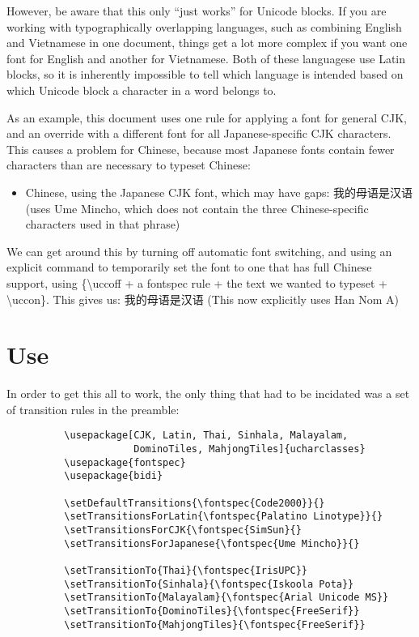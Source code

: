 ﻿\documentclass{article}
\newenvironment{itemlist}{%
  \begin{itemize}
	\setlength{\itemsep}{0pt}
	\setlength{\parsep}{0pt}
	\setlength{\topsep}{0pt}
	\setlength{\partopsep}{0pt}
	\setlength{\parskip}{0pt}
	\setlength{\labelsep}{5pt}}%
{
  \end{itemize}}
\begin{document}
		However, be aware that this only “just works” for Unicode blocks. If you are working with typographically overlapping languages, such as combining English and Vietnamese in one document, things get a lot more complex if you want one font for English and another for Vietnamese. Both of these languagese use Latin blocks, so it is inherently impossible to tell which language is intended based on which Unicode block a character in a word belongs to.
		
		As an example, this document uses one rule for applying a font for general CJK, and an override with a different font for all Japanese-specific CJK characters. This causes a problem for Chinese, because most Japanese fonts contain fewer characters than are necessary to typeset Chinese:

    \begin{itemlist}
			\item Chinese, using the Japanese CJK font, which may have gaps: 我的母语是汉语 (uses Ume Mincho, which does not contain the three Chinese-specific characters used in that phrase)
    \end{itemlist}

  We can get around this by turning off automatic font switching, and using an explicit command to temporarily set the font to one that has full Chinese support, using \{\textbackslash uccoff + a fontspec rule + the text we wanted to typeset + \textbackslash uccon\}. This gives us: {\uccoff {} 我的母语是汉语 \uccon} (This now explicitly uses Han Nom A)

	\section{Use}

		In order to get this all to work, the only thing that had to be incidated was a set of transition rules in the preamble:
		
		\disableTransitionRules
		\begin{verbatim}
　　　　　　\usepackage[CJK, Latin, Thai, Sinhala, Malayalam,
　　　　　　            DominoTiles, MahjongTiles]{ucharclasses}
　　　　　　\usepackage{fontspec}
　　　　　　\usepackage{bidi}

　　　　　　\setDefaultTransitions{\fontspec{Code2000}}{}
　　　　　　\setTransitionsForLatin{\fontspec{Palatino Linotype}}{}
　　　　　　\setTransitionsForCJK{\fontspec{SimSun}{}
　　　　　　\setTransitionsForJapanese{\fontspec{Ume Mincho}}{}

　　　　　　\setTransitionTo{Thai}{\fontspec{IrisUPC}}
　　　　　　\setTransitionTo{Sinhala}{\fontspec{Iskoola Pota}}
　　　　　　\setTransitionTo{Malayalam}{\fontspec{Arial Unicode MS}}
　　　　　　\setTransitionTo{DominoTiles}{\fontspec{FreeSerif}}
　　　　　　\setTransitionTo{MahjongTiles}{\fontspec{FreeSerif}}
		\end{verbatim}
		\enableTransitionRules
\end{document}
